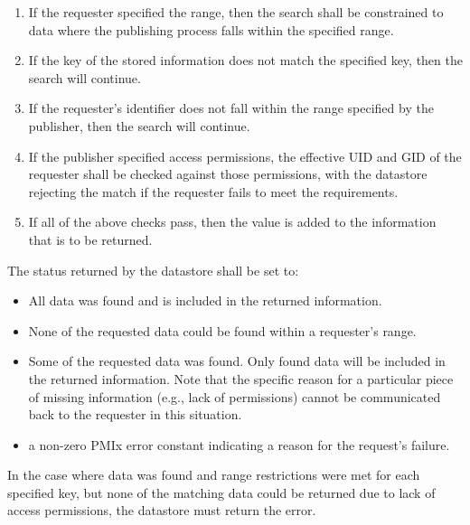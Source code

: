 \begin{enumerate}
    \item If the requester specified the range, then the search shall be constrained to data where the publishing process falls within the specified range.

    \item If the key of the stored information does not match the specified key, then the search will continue.

    \item If the requester's identifier does not fall within the range specified by the publisher, then the search will continue.

    \item If the publisher specified access permissions, the effective \ac{UID} and \ac{GID} of the requester shall be checked against those permissions, with the datastore rejecting the match if the requester fails to meet the requirements.

    \item If all of the above checks pass, then the value is added to the information that is to be returned.
\end{enumerate}

The status returned by the datastore shall be set to:

\begin{itemize}
\item {} All data was found and is included in the returned information.

\item {} None of the requested data could be found within a requester's range.

\item {} Some of the requested data was found.
Only found data will be included in the returned information. Note that the specific reason for a particular piece of missing information (e.g., lack of permissions) cannot be communicated back to the requester in this situation.

\item a non-zero \ac{PMIx} error constant indicating a reason for the request's failure.
\end{itemize}

In the case where data was found and range restrictions were met for each specified key, but none of the matching data could be returned due to lack of access permissions, the datastore must return the   error.

